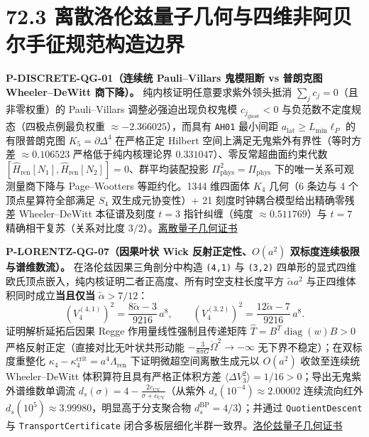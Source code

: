 \documentclass[
  11pt,
  oneside]{book}
\begin{document}
\section{72.3 离散洛伦兹量子几何与四维非阿贝尔手征规范构造边界}

\protect\hypertarget{p-discrete-qg-01}{}{}

\textbf{P-DISCRETE-QG-01（连续统 Pauli--Villars 鬼模阻断 vs 普朗克图
Wheeler--DeWitt 商下降）。} 纯内核证明任意要求紫外领头抵消
\(\sum_j c_j = 0\)（且非零权重）的 Pauli--Villars 调整必强迫出现负权鬼模
\(c_{j_{\mathrm{ghost}}} < 0\) 与负范数不定度规态（四极点例最负权重
\(\approx -2.366025\)），而具有 \texttt{AH01} 最小间距
\(a_{\mathrm{lat}} \ge L_{\min}\ell_P\) 的有限普朗克图
\(K_5 = \partial\Delta^4\) 在严格正定 Hilbert
空间上满足无鬼紫外有界性（等时方差 \(\approx 0.106523\)
严格低于纯内核理论界 \(0.331047\)）、零反常超曲面约束代数
\([\hat H_{\mathrm{ren}}[N_1], \hat H_{\mathrm{ren}}[N_2]] = 0\)、群平均装配投影
\(\Pi_{\mathrm{phys}}^2 = \Pi_{\mathrm{phys}}\)
下的唯一关系可观测量商下降与 Page--Wootters 等距约化。1344 维四面体
\(K_4\) 几何（6 条边与 4 个顶点星算符全部满足 \(S_4\) 双生成元协变性）+
21 刻度时钟耦合模型给出精确零残差 Wheeler--DeWitt 本征谱及刻度 \(t=3\)
指针纠缠（纯度 \(\approx 0.511769\)）与 \(t=7\) 精确相干复苏（关系对比度
\(3/2\)）。\href{../../unification/discrete_quantum_geometry/certificate.json}{离散量子几何证书}

\protect\hypertarget{p-lorentz-qg-07}{}{}

\textbf{P-LORENTZ-QG-07（因果叶状 Wick 反射正定性、\(O(a^2)\)
双标度连续极限与谱维数流）。} 在洛伦兹因果三角剖分中构造 \texttt{(4,1)}
与 \texttt{(3,2)}
四单形的显式四维欧氏顶点嵌入，纯内核证明二者正高度、所有时空支柱长度平方
\(\tilde\alpha a^2\) 与正四维体积同时成立\textbf{当且仅当}
\(\tilde\alpha > 7/12\)： \[
(V_4^{(4,1)})^2 = \frac{8\tilde\alpha - 3}{9216}\,a^8, \qquad (V_4^{(3,2)})^2 = \frac{12\tilde\alpha - 7}{9216}\,a^8.
\] 证明解析延拓后因果 Regge 作用量线性强制且传递矩阵
\(\hat T = B^T \operatorname{diag}(w) B > 0\)
严格反射正定（直接对比无叶状共形动能
\(-\frac{3}{8\pi G}\dot\Omega^2 \to -\infty\)
无下界不稳定）；在双标度重整化
\(\kappa_4 - \kappa_4^{\mathrm{crit}} = a^4\Lambda_{\mathrm{ren}}\)
下证明微超空间离散生成元以 \(O(a^2)\) 收敛至连续统 Wheeler--DeWitt
体积算符且具有严格正体积方差
\(\langle\Delta V_3^2\rangle = 1/16 > 0\)；导出无鬼紫外谱维数单调流
\(d_s(\sigma) = 4 - \frac{2c_{\mathrm{UV}}}{\sigma+c_{\mathrm{UV}}}\)（从紫外
\(d_s(10^{-4}) \approx 2.00002\) 连续流向红外
\(d_s(10^5) \approx 3.99980\)，明显高于分支聚合物
\(d_s^{\mathrm{BP}} = 4/3\)）；并通过 \texttt{Quotient\allowbreak Descent} 与
\texttt{Transport\allowbreak Certificate}
闭合多板层细化半群一致界。\href{../../unification/lorentzian_causal_qg_limit/certificate.json}{洛伦兹量子几何证书}
\end{document}
